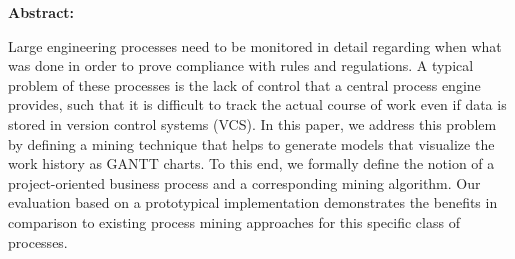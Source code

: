 \bigskip

{\noindent\bfseries \Large Abstract: \medskip}


\noindent Large engineering processes need to be monitored in detail regarding when what was done in order to prove compliance with rules and regulations. A typical problem of these processes is the lack of control that a central process engine provides, such that it is difficult to track the actual course of work even if data is stored in version control systems (VCS). In this paper, we address this problem by defining a mining technique that helps to generate models that visualize the work history as GANTT charts. To this end, we formally define the notion of a project-oriented business process and a corresponding mining algorithm. Our evaluation based on a prototypical implementation demonstrates the benefits in comparison to existing process mining approaches for this specific class of processes.


\pagebreak



%









